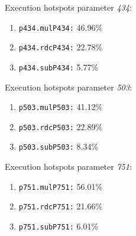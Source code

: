 Execution hotspots parameter \textit{434}:
\begin{enumerate}[noitemsep]
	\item \texttt{p434.mulP434:} 46.96\%
	\item \texttt{p434.rdcP434:} 22.78\%
	\item \texttt{p434.subP434:} 5.77\%
\end{enumerate}
Execution hotspots parameter \textit{503}:
\begin{enumerate}[noitemsep]
	\item \texttt{p503.mulP503:} 41.12\%
	\item \texttt{p503.rdcP503:} 22.89\%
	\item \texttt{p503.subP503:} 8.34\%
\end{enumerate}
Execution hotspots parameter \textit{751}:
\begin{enumerate}[noitemsep]
	\item \texttt{p751.mulP751:} 56.01\%
	\item \texttt{p751.rdcP751:} 21.66\%
	\item \texttt{p751.subP751:} 6.01\%
\end{enumerate}
